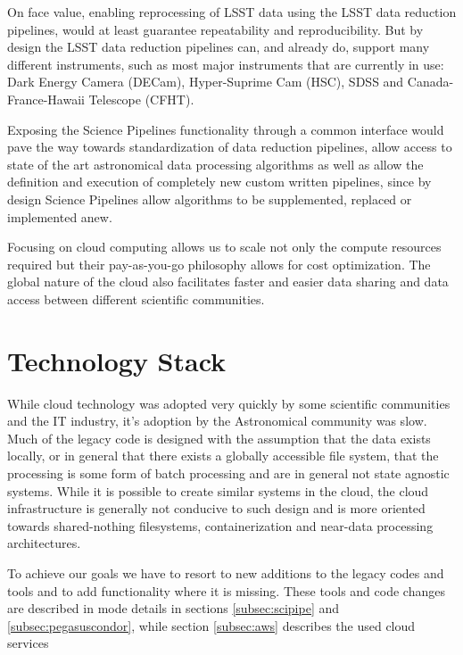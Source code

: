 \documentclass[a4paper, 10pt, conference]{ieeeconf}
\begin{document}
On face value, enabling reprocessing of LSST data using the LSST data reduction pipelines, would at least guarantee repeatability and reproducibility. But by design the LSST data reduction pipelines can, and already do, support many different instruments, such as most major instruments that are currently in use: Dark Energy Camera (DECam), Hyper-Suprime Cam (HSC), SDSS and Canada-France-Hawaii Telescope (CFHT).

Exposing the Science Pipelines functionality through a common interface would pave the way towards standardization of data reduction pipelines, allow access to state of the art astronomical data processing algorithms as well as allow the definition and execution of completely new custom written pipelines, since by design Science Pipelines allow algorithms to be supplemented, replaced or implemented anew. 

Focusing on cloud computing allows us to scale not only the compute resources required but their pay-as-you-go philosophy allows for cost optimization. The global nature of the cloud also facilitates faster and easier data sharing and data access between different scientific communities. 


\section{Technology Stack}
\label{sec:techstack}

While cloud technology was adopted very quickly by some scientific communities and the IT industry, it's adoption by the Astronomical community was slow. Much of the legacy code is designed with the assumption that the data exists locally, or in general that there exists a globally accessible file system, that the processing is some form of batch processing and are in general not state agnostic systems. While it is possible to create similar systems in the cloud, the cloud infrastructure is generally not conducive to such design and is more oriented towards shared-nothing filesystems, containerization and near-data processing architectures. 

To achieve our goals we have to resort to new additions to the legacy codes and tools and to add functionality where it is missing. These tools and code changes are described in mode details in sections \ref{subsec:scipipe} and \ref{subsec:pegasuscondor}, while section \ref{subsec:aws} describes the used cloud services
\end{document}
